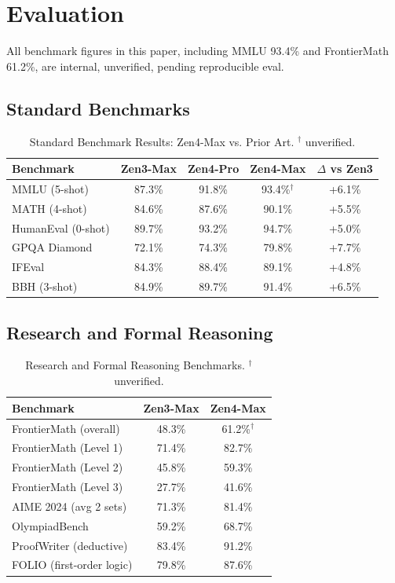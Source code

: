 \documentclass[11pt,a4paper]{article}
\begin{document}
\section{Evaluation}

All benchmark figures in this paper, including MMLU 93.4\% and FrontierMath 61.2\%, are internal, unverified, pending reproducible eval.

\subsection{Standard Benchmarks}

\begin{table}[H]
\centering
\begin{tabular}{lcccc}
\toprule
\textbf{Benchmark} & \textbf{Zen3-Max} & \textbf{Zen4-Pro} & \textbf{Zen4-Max} & \textbf{$\Delta$ vs Zen3} \\
\midrule
MMLU (5-shot)         & 87.3\% & 91.8\% & 93.4\%$^{\dagger}$ & +6.1\% \\
MATH (4-shot)         & 84.6\% & 87.6\% & 90.1\% & +5.5\% \\
HumanEval (0-shot)    & 89.7\% & 93.2\% & 94.7\% & +5.0\% \\
GPQA Diamond          & 72.1\% & 74.3\% & 79.8\% & +7.7\% \\
IFEval                & 84.3\% & 88.4\% & 89.1\% & +4.8\% \\
BBH (3-shot)          & 84.9\% & 89.7\% & 91.4\% & +6.5\% \\
\bottomrule
\end{tabular}
\caption{Standard Benchmark Results: Zen4-Max vs. Prior Art. $^{\dagger}$ unverified.}
\end{table}

\subsection{Research and Formal Reasoning}

\begin{table}[H]
\centering
\begin{tabular}{lcc}
\toprule
\textbf{Benchmark} & \textbf{Zen3-Max} & \textbf{Zen4-Max} \\
\midrule
FrontierMath (overall)        & 48.3\% & 61.2\%$^{\dagger}$ \\
FrontierMath (Level 1)        & 71.4\% & 82.7\% \\
FrontierMath (Level 2)        & 45.8\% & 59.3\% \\
FrontierMath (Level 3)        & 27.7\% & 41.6\% \\
AIME 2024 (avg 2 sets)        & 71.3\% & 81.4\% \\
OlympiadBench                 & 59.2\% & 68.7\% \\
ProofWriter (deductive)       & 83.4\% & 91.2\% \\
FOLIO (first-order logic)     & 79.8\% & 87.6\% \\
\bottomrule
\end{tabular}
\caption{Research and Formal Reasoning Benchmarks. $^{\dagger}$ unverified.}
\end{table}
\end{document}

